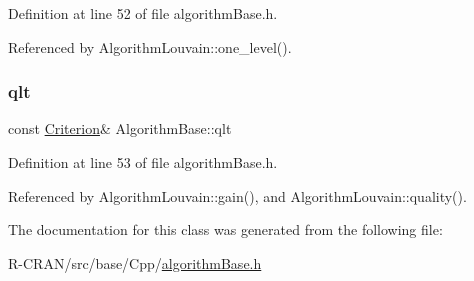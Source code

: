 Definition at line 52 of file algorithm\+Base.\+h.



Referenced by Algorithm\+Louvain\+::one\+\_\+level().

\mbox{\label{classAlgorithmBase_aa1e529eb903df296a7a7ef67f06537d8}} 
\subsubsection{\texorpdfstring{qlt}{qlt}}
{\footnotesize\ttfamily const \hyperlink{classCriterion}{Criterion}\& Algorithm\+Base\+::qlt\hspace{0.3cm}{\ttfamily [protected]}}



Definition at line 53 of file algorithm\+Base.\+h.



Referenced by Algorithm\+Louvain\+::gain(), and Algorithm\+Louvain\+::quality().



The documentation for this class was generated from the following file\+:\begin{DoxyCompactItemize}
\item 
R-\/\+C\+R\+A\+N/src/base/\+Cpp/\hyperlink{algorithmBase_8h}{algorithm\+Base.\+h}\end{DoxyCompactItemize}
